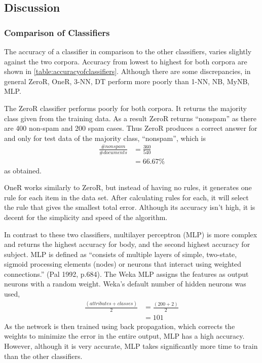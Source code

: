 \documentclass[10pt, a4paper]{article}
\begin{document}
\subsection{Discussion}

%

\subsubsection{Comparison of Classifiers}

The accuracy of a classifier in comparison to the other classifiers, varies slightly against the two corpora.  Accuracy from lowest to highest for both corpora are shown in \autoref{table:accuracyofclassifiers}. Although there are some discrepancies, in general ZeroR, OneR, 3-NN, DT perform more poorly than 1-NN, NB, MyNB, MLP.

The ZeroR classifier performs poorly for both corpora. It returns the majority class given from the training data. As a result ZeroR returns ``nonspam'' as there are 400 non-spam and 200 spam cases. Thus ZeroR produces a correct answer for and only for test data of the majority class, ``nonspam'', which is
\begin{align*} \frac{\# nonspam}{\# documents} &=  \frac{360}{540} \\ &= 66.67\%
\end{align*}
as obtained.

OneR works similarly to ZeroR, but instead of having no rules, it generates one rule for each item in the data set. After calculating rules for each, it will select the rule that gives the smallest total error. Although its accuracy isn't high, it is decent for the simplicity and speed of the algorithm.

In contrast to these two classifiers, multilayer perceptron (MLP) is more complex and returns the highest accuracy for body, and the second highest accuracy for subject. MLP is defined as ``consists of multiple layers of simple, two-state, sigmoid processing elements (nodes) or neurons that interact using weighted connections.'' (Pal 1992, p.684). The Weka MLP assigns the features as output neurons with a random weight. Weka's default number of hidden neurons\cite{WekaMLP} was used,
\begin{align*} \frac{(attributes + classes)}{2} &= \frac{(200+2)}{2} \\&= 101
\end{align*}
As the network is then trained using back propagation, which corrects the weights to minimize the error in the entire output, MLP has a high accuracy. However, although it is very accurate, MLP takes significantly more time to train than the other classifiers.
\end{document}
